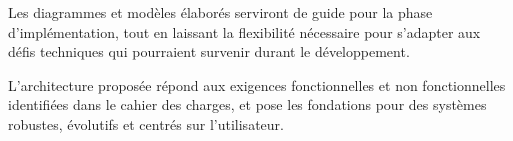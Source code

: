 Les diagrammes et modèles élaborés serviront de guide pour la phase d'implémentation, tout en laissant la flexibilité nécessaire pour s'adapter aux défis techniques qui pourraient survenir durant le développement.

L'architecture proposée répond aux exigences fonctionnelles et non fonctionnelles identifiées dans le cahier des charges, et pose les fondations pour des systèmes robustes, évolutifs et centrés sur l'utilisateur. 